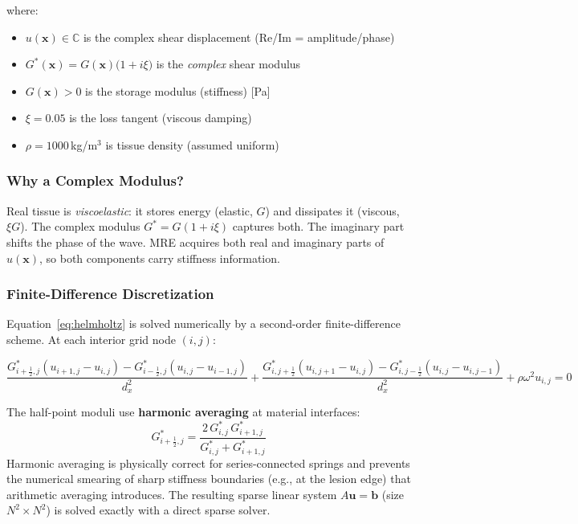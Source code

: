 \documentclass[11pt,letterpaper]{article}
\newcommand{\C}{\mathbb{C}}
\newcommand{\xvec}{\bm{x}}
\newcommand{\Gstar}{G^*}
\begin{document}
\noindent where:
\begin{itemize}[leftmargin=2em]
    \item $u(\xvec) \in \C$ is the complex shear displacement (Re/Im = amplitude/phase)
    \item $\Gstar(\xvec) = G(\xvec)\bigl(1 + i\xi\bigr)$ is the \emph{complex} shear modulus
    \item $G(\xvec) > 0$ is the storage modulus (stiffness) [Pa]
    \item $\xi = 0.05$ is the loss tangent (viscous damping)
    \item $\rho = 1000$\,kg/m$^3$ is tissue density (assumed uniform)
\end{itemize}

\subsubsection{Why a Complex Modulus?}

Real tissue is \emph{viscoelastic}: it stores energy (elastic, $G$) and dissipates it
(viscous, $\xi G$). The complex modulus $\Gstar = G(1+i\xi)$ captures both.
The imaginary part shifts the phase of the wave. MRE acquires both real and imaginary
parts of $u(\xvec)$, so both components carry stiffness information.

\subsubsection{Finite-Difference Discretization}

Equation~\eqref{eq:helmholtz} is solved numerically by a second-order finite-difference
scheme. At each interior grid node $(i,j)$:

\[
    \frac{G^*_{i+\frac{1}{2},j}(u_{i+1,j} - u_{i,j})
         - G^*_{i-\frac{1}{2},j}(u_{i,j} - u_{i-1,j})}{d_x^2}
    +
    \frac{G^*_{i,j+\frac{1}{2}}(u_{i,j+1} - u_{i,j})
         - G^*_{i,j-\frac{1}{2}}(u_{i,j} - u_{i,j-1})}{d_x^2}
    + \rho\omega^2 u_{i,j} = 0
\]

The half-point moduli use \textbf{harmonic averaging} at material interfaces:
\[
    G^*_{i+\frac{1}{2},j} = \frac{2\,G^*_{i,j}\,G^*_{i+1,j}}{G^*_{i,j} + G^*_{i+1,j}}
\]
Harmonic averaging is physically correct for series-connected springs and prevents the
numerical smearing of sharp stiffness boundaries (e.g., at the lesion edge) that arithmetic
averaging introduces. The resulting sparse linear system $A\bm{u} = \bm{b}$ (size $N^2
\times N^2$) is solved exactly with a direct sparse solver.
\end{document}
